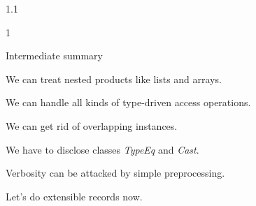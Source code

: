 \documentclass{slides}
\newenvironment{myslide}{\begin{slide}\color{Blue}\begin{boxedminipage}{1.1\hsize}\begin{boxedminipage}{1\hsize}\color{Black}
\vspace{-170\in}
}{%
\smallskip
\end{boxedminipage}
\end{boxedminipage}
\end{slide}}
\newenvironment{myslide}{\begin{slide}
}{%
\end{slide}}
\newenvironment{myslide}{\begin{slide}\color{White}\begin{boxedminipage}{1.1\hsize}\color{Black}
\vspace{-170\in}
}{%
\smallskip
\end{boxedminipage}
\end{slide}}
\newcommand{\header}[1]{{\large \color{Red} #1}}
\begin{document}



\begin{myslide}

\header{Intermediate summary}

{\small

We can treat nested products like lists and arrays.

We can handle all kinds of type-driven access operations.

We can get rid of overlapping instances.

We have to disclose classes \emph{TypeEq} and \emph{Cast}.

Verbosity can be attacked by simple preprocessing.

\bigskip
\bigskip

Let's do extensible records now.

}

\end{myslide}



\end{document}
